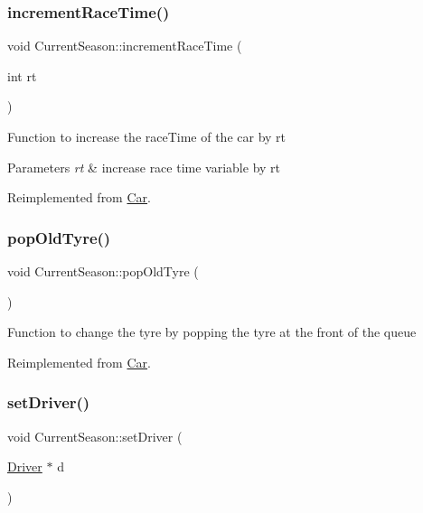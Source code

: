 \subsubsection{\texorpdfstring{increment\+Race\+Time()}{incrementRaceTime()}}
{\footnotesize\ttfamily void Current\+Season\+::increment\+Race\+Time (\begin{DoxyParamCaption}\item[{int}]{rt }\end{DoxyParamCaption})\hspace{0.3cm}{\ttfamily [virtual]}}

Function to increase the race\+Time of the car by rt 
\begin{DoxyParams}{Parameters}
{\em rt} & increase race time variable by rt \\
\hline
\end{DoxyParams}


Reimplemented from \hyperlink{classCar}{Car}.

\mbox{\label{classCurrentSeason_a4d58f649f43cc8ea8c1e7e0745b7dc1f}} 
\subsubsection{\texorpdfstring{pop\+Old\+Tyre()}{popOldTyre()}}
{\footnotesize\ttfamily void Current\+Season\+::pop\+Old\+Tyre (\begin{DoxyParamCaption}{ }\end{DoxyParamCaption})\hspace{0.3cm}{\ttfamily [virtual]}}

Function to change the tyre by popping the tyre at the front of the queue 

Reimplemented from \hyperlink{classCar}{Car}.

\mbox{\label{classCurrentSeason_a3ea9de8713c6d2c21202351b036af75f}} 
\subsubsection{\texorpdfstring{set\+Driver()}{setDriver()}}
{\footnotesize\ttfamily void Current\+Season\+::set\+Driver (\begin{DoxyParamCaption}\item[{\hyperlink{classDriver}{Driver} $\ast$}]{d }\end{DoxyParamCaption})\hspace{0.3cm}{\ttfamily [virtual]}}

